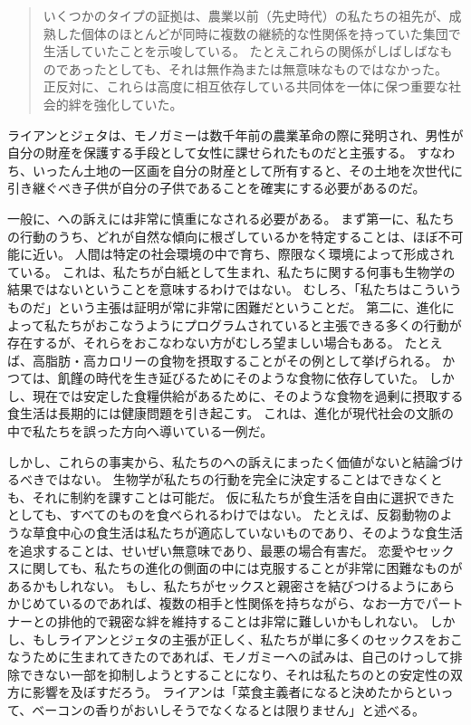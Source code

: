 \documentclass[paper=a4,book,openany]{jlreq}
\begin{document}
\begin{quote}

いくつかのタイプの証拠は、農業以前（先史時代）の私たちの祖先が、成熟した個体のほとんどが同時に複数の継続的な性関係を持っていた集団で生活していたことを示唆している。
たとえこれらの関係がしばしばなものであったとしても、それは無作為または無意味なものではなかった。
正反対に、これらは高度に相互依存している共同体を一体に保つ重要な社会的絆を強化していた。
\citep[pp.9--10]{ryan10:_sex_dawn}
\end{quote}

ライアンとジェタは、モノガミーは数千年前の農業革命の際に発明され、男性が自分の財産を保護する手段として女性に課せられたものだと主張する。
すなわち、いったん土地の一区画を自分の財産として所有すると、その土地を次世代に引き継ぐべき子供が自分の子供であることを確実にする必要があるのだ。

一般に、への訴えには非常に慎重になされる必要がある。
まず第一に、私たちの行動のうち、どれが自然な傾向に根ざしているかを特定することは、ほぼ不可能に近い。
人間は特定の社会環境の中で育ち、際限なく環境によって形成されている。
これは、私たちが白紙として生まれ、私たちに関する何事も生物学の結果ではないということを意味するわけではない。
むしろ、「私たちはこういうものだ」という主張は証明が常に非常に困難だということだ。
第二に、進化によって私たちがおこなうようにプログラムされていると主張できる多くの行動が存在するが、それらをおこなわない方がむしろ望ましい場合もある。
たとえば、高脂肪・高カロリーの食物を摂取することがその例として挙げられる。
かつては、飢饉の時代を生き延びるためにそのような食物に依存していた。
しかし、現在では安定した食糧供給があるために、そのような食物を過剰に摂取する食生活は長期的には健康問題を引き起こす。
これは、進化が現代社会の文脈の中で私たちを誤った方向へ導いている一例だ。

しかし、これらの事実から、私たちのへの訴えにまったく価値がないと結論づけるべきではない。
生物学が私たちの行動を完全に決定することはできなくとも、それに制約を課すことは可能だ。
仮に私たちが食生活を自由に選択できたとしても、すべてのものを食べられるわけではない。
たとえば、反芻動物のような草食中心の食生活は私たちが適応していないものであり、そのような食生活を追求することは、せいぜい無意味であり、最悪の場合有害だ。
恋愛やセックスに関しても、私たちの進化の側面の中には克服することが非常に困難なものがあるかもしれない。
もし、私たちがセックスと親密さを結びつけるようにあらかじめているのであれば、複数の相手と性関係を持ちながら、なお一方でパートナーとの排他的で親密な絆を維持することは非常に難しいかもしれない。
しかし、もしライアンとジェタの主張が正しく、私たちが単に多くのセックスをおこなうために生まれてきたのであれば、モノガミーへの試みは、自己のけっして排除できない一部を抑制しようとすることになり、それは私たちのとの安定性の双方に影響を及ぼすだろう。
ライアンは「菜食主義者になると決めたからといって、ベーコンの香りがおいしそうでなくなるとは限りません」と述べる\citep{bishop10:_ask_chris_ryan_ph}。
\end{document}

